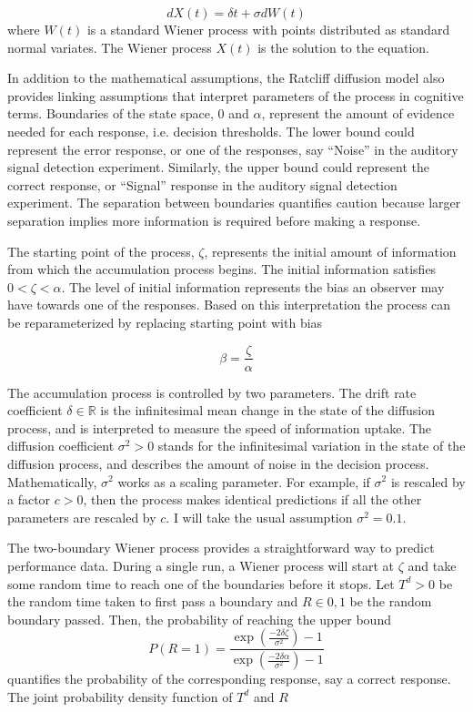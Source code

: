 \documentclass[12pt]{article}
\begin{document}
\begin{equation}
dX(t) = \delta t + \sigma dW(t)
\end{equation}
where $W(t)$  is a standard Wiener process with points distributed as standard normal variates. The Wiener process $X(t)$ is the solution to the equation.

	In addition to the mathematical assumptions, the Ratcliff diffusion model also provides linking assumptions that interpret parameters of the process in cognitive terms. Boundaries of the state space, 0 and $\alpha$, represent the amount of evidence needed for each response, i.e. decision thresholds. The lower bound could represent the error response, or one of the responses, say “Noise” in the auditory signal detection experiment. Similarly, the upper bound could represent the correct response, or “Signal” response in the auditory signal detection experiment. The separation between boundaries quantifies caution because larger separation implies more information is required before making a response. 
    
	The starting point of the process, $\zeta$, represents the initial amount of information from which the accumulation process begins. The initial information satisfies $0 < \zeta < \alpha$. The level of initial information represents the bias an observer may have towards one of the responses. Based on this interpretation the process can be reparameterized by replacing starting point with bias

\begin{equation}
\beta = \frac{\zeta}{\alpha}
\end{equation} 
 
	The accumulation process is controlled by two parameters. The drift rate coefficient $\delta \in \mathbb{R}$  is the infinitesimal mean change in the state of the diffusion process, and is interpreted to measure the speed of information uptake. The diffusion coefficient $\sigma^2 > 0$  stands for the infinitesimal variation in the state of the diffusion process, and describes the amount of noise in the decision process. Mathematically, $\sigma^2$ works as a scaling parameter. For example, if $\sigma^2$ is rescaled by a factor $c > 0$, then the process makes identical predictions if all the other parameters are rescaled by $c$. I will take the usual assumption $\sigma^2 = 0.1$.
    
    The two-boundary Wiener process provides a straightforward way to predict performance data. During a single run, a Wiener process will start at $\zeta$ and take some random time to reach one of the boundaries before it stops. Let $T^d > 0$ be the random time taken to first pass a boundary and $R \in {0, 1}$ be the random boundary passed. Then, the probability of reaching the upper bound 
\begin{equation}
P(R = 1) = \frac{\operatorname{exp}(\frac{-2\delta \zeta}{\sigma^2})-1}{\operatorname{exp}(\frac{-2\delta \alpha}{\sigma^2})-1}
\end{equation}
quantifies the probability of the corresponding response, say a correct response. The joint probability density function of $T^d$ and $R$
\end{document}
